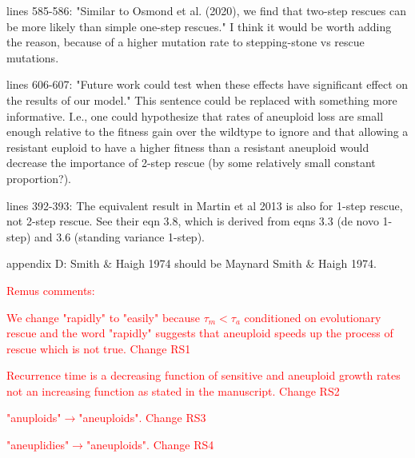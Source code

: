 \documentclass[12pt]{extarticle}
\begin{document}
lines 585-586: "Similar to Osmond et al. (2020), we find that two-step rescues can be more likely than simple one-step rescues." I think it would be worth adding the reason, because of a higher mutation rate to stepping-stone vs rescue mutations.

lines 606-607: "Future work could test when these effects have significant effect on the results of our model." This sentence could be replaced with something more informative. I.e., one could hypothesize that rates of aneuploid loss are small enough relative to the fitness gain over the wildtype to ignore and that allowing a resistant euploid to have a higher fitness than a resistant aneuploid would decrease the importance of 2-step rescue (by some relatively small constant proportion?).

lines 392-393: The equivalent result in Martin et al 2013 is also for 1-step rescue, not 2-step rescue. See their eqn 3.8, which is derived from eqns 3.3 (de novo 1-step) and 3.6 (standing variance 1-step).

appendix D: Smith $\&$ Haigh 1974 should be Maynard Smith $\&$ Haigh 1974.

\textcolor{red}{Remus comments:}

\textcolor{red}{We change "rapidly" to "easily" because $\tau_m<\tau_a$ conditioned on evolutionary rescue and the word "rapidly" suggests that aneuploid speeds up the process of rescue which is not true. Change RS1}

\textcolor{red}{Recurrence time is a decreasing function of sensitive and aneuploid growth rates not an increasing function as stated in the manuscript. Change RS2}

\textcolor{red}{"anuploids"$\rightarrow$"aneuploids". Change RS3}

\textcolor{red}{"aneuplidies"$\rightarrow$"aneuploids". Change RS4}








\end{document}
